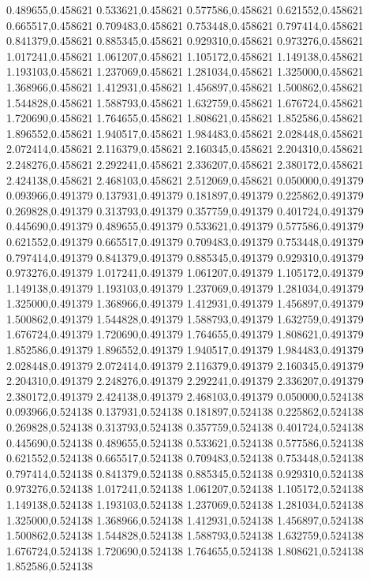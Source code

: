 0.489655,0.458621
0.533621,0.458621
0.577586,0.458621
0.621552,0.458621
0.665517,0.458621
0.709483,0.458621
0.753448,0.458621
0.797414,0.458621
0.841379,0.458621
0.885345,0.458621
0.929310,0.458621
0.973276,0.458621
1.017241,0.458621
1.061207,0.458621
1.105172,0.458621
1.149138,0.458621
1.193103,0.458621
1.237069,0.458621
1.281034,0.458621
1.325000,0.458621
1.368966,0.458621
1.412931,0.458621
1.456897,0.458621
1.500862,0.458621
1.544828,0.458621
1.588793,0.458621
1.632759,0.458621
1.676724,0.458621
1.720690,0.458621
1.764655,0.458621
1.808621,0.458621
1.852586,0.458621
1.896552,0.458621
1.940517,0.458621
1.984483,0.458621
2.028448,0.458621
2.072414,0.458621
2.116379,0.458621
2.160345,0.458621
2.204310,0.458621
2.248276,0.458621
2.292241,0.458621
2.336207,0.458621
2.380172,0.458621
2.424138,0.458621
2.468103,0.458621
2.512069,0.458621
0.050000,0.491379
0.093966,0.491379
0.137931,0.491379
0.181897,0.491379
0.225862,0.491379
0.269828,0.491379
0.313793,0.491379
0.357759,0.491379
0.401724,0.491379
0.445690,0.491379
0.489655,0.491379
0.533621,0.491379
0.577586,0.491379
0.621552,0.491379
0.665517,0.491379
0.709483,0.491379
0.753448,0.491379
0.797414,0.491379
0.841379,0.491379
0.885345,0.491379
0.929310,0.491379
0.973276,0.491379
1.017241,0.491379
1.061207,0.491379
1.105172,0.491379
1.149138,0.491379
1.193103,0.491379
1.237069,0.491379
1.281034,0.491379
1.325000,0.491379
1.368966,0.491379
1.412931,0.491379
1.456897,0.491379
1.500862,0.491379
1.544828,0.491379
1.588793,0.491379
1.632759,0.491379
1.676724,0.491379
1.720690,0.491379
1.764655,0.491379
1.808621,0.491379
1.852586,0.491379
1.896552,0.491379
1.940517,0.491379
1.984483,0.491379
2.028448,0.491379
2.072414,0.491379
2.116379,0.491379
2.160345,0.491379
2.204310,0.491379
2.248276,0.491379
2.292241,0.491379
2.336207,0.491379
2.380172,0.491379
2.424138,0.491379
2.468103,0.491379
0.050000,0.524138
0.093966,0.524138
0.137931,0.524138
0.181897,0.524138
0.225862,0.524138
0.269828,0.524138
0.313793,0.524138
0.357759,0.524138
0.401724,0.524138
0.445690,0.524138
0.489655,0.524138
0.533621,0.524138
0.577586,0.524138
0.621552,0.524138
0.665517,0.524138
0.709483,0.524138
0.753448,0.524138
0.797414,0.524138
0.841379,0.524138
0.885345,0.524138
0.929310,0.524138
0.973276,0.524138
1.017241,0.524138
1.061207,0.524138
1.105172,0.524138
1.149138,0.524138
1.193103,0.524138
1.237069,0.524138
1.281034,0.524138
1.325000,0.524138
1.368966,0.524138
1.412931,0.524138
1.456897,0.524138
1.500862,0.524138
1.544828,0.524138
1.588793,0.524138
1.632759,0.524138
1.676724,0.524138
1.720690,0.524138
1.764655,0.524138
1.808621,0.524138
1.852586,0.524138
